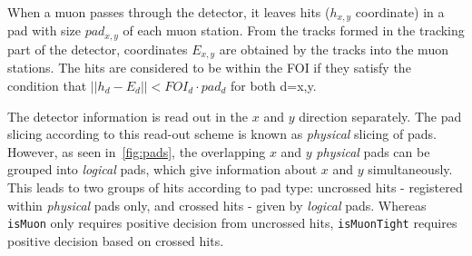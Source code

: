 When a muon passes through the detector, it leaves hits ($h_{x,y}$ coordinate) in a pad with size $pad_{x,y}$ of each muon station. From the tracks formed in the tracking part of the detector, coordinates $E_{x,y}$ are obtained by \DIFdelbegin {}\DIFdelend \DIFaddbegin {}\DIFaddend the tracks into the muon stations. The hits are considered to be within the \gls{FOI} if they satisfy the condition that $|| h_{d} - E_{d} || < FOI_{d} \cdot pad_{d}$ for both d={x,y}. 

\color{black}

The detector information is read out in the $x$ and $y$ direction separately. The pad slicing according to this read-out scheme is known as \textit{physical} slicing of pads. However, as seen in~\autoref{fig:pads}, the overlapping $x$ and $y$ \textit{physical} pads can be grouped into \textit{logical} pads, which give information about $x$ and $y$ simultaneously. This leads to two groups of hits according to pad type: uncrossed hits - registered within \textit{physical} pads only, and crossed hits - given by \textit{logical} pads. Whereas \texttt{isMuon} only requires \DIFaddbegin {}\DIFaddend positive decision from uncrossed hits, \texttt{isMuonTight} requires \DIFaddbegin {}\DIFaddend positive decision based on crossed hits. 


